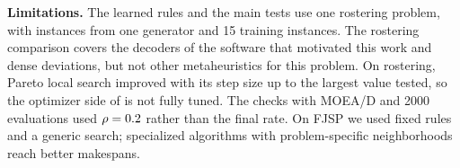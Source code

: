 \textbf{Limitations.}
The learned rules and the main tests use one rostering problem, with instances from one generator and 15 training instances.
The rostering comparison covers the decoders of the software that motivated this work and dense deviations, but not other metaheuristics for this problem.
On rostering, Pareto local search improved with its step size up to the largest value tested, so the optimizer side of \RDD is not fully tuned.
The checks with MOEA/D and 2000 evaluations used $\rho = 0.2$ rather than the final rate.
On FJSP we used fixed rules and a generic search; specialized algorithms with problem-specific neighborhoods reach better makespans.
